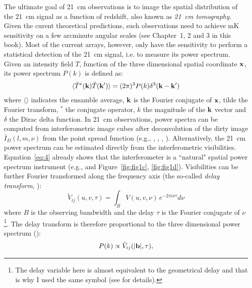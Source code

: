 The ultimate goal of 21~cm observations is to image the spatial distribution of the 21~cm signal as a function of redshift, also known as {\it 21~cm tomography}. Given the curent theoretical predictions, such observations need to achieve mK sensitivity on a few arcminute angular scales (see Chapter~1, 2 and 3 in this book). Most of the current arrays, however, only have the sensitivity to perform a statistical detection of the 21~cm signal, i.e. to measure its power spectrum. Given an intensity field $T$, function of the three dimensional spatial coordinate $\bf x$, its power spectrum $P(k)$ is defined as:
\begin{equation}
\langle {\tilde T}^* ({\bf k}) {\tilde T}({\bf k'}) \rangle = (2 \pi)^3 P(k) \delta^3({\bf k} - {\bf k}')
\label{sec_observables_eq1}
\end{equation}
where $\langle \rangle$ indicates the ensamble average, $\bf k$ is the Fourier conjugate of $\bf x$, tilde the Fourier transform, $^*$ the conjugate operator, $k$ the magnitude of the $\bf k$ vector and $\delta$ the Dirac delta function. In 21~cm observations, power spectra can be computed from interferometric image cubes after deconvolution of the dirty image ${\bar I}_D (l,m,\nu)$ from the point spread function (e.g., \cite{pen09}, \cite{harker10}, \cite{beardsley16}, \cite{patil17}). Alternatively, the 21~cm power spectrum can be estimated directly from the interferometric visibilities. Equation~\ref{eq:4} already shows that the interferometer is a ``natural" spatial power spectrum instrument (e.g., \cite{white99} and Figure~\ref{fig:fig1c}, \ref{fig:fig1d}). Visibilities can be further Fourier transformed along the frequency axis (the so-called {\it delay transform}, \cite{parsons12a}): 
\begin{equation}
{\tilde V}_{ij} (u,v, \tau) = \int_B V (u,v, \nu) \, e^{-2 \pi i \nu \tau} d \nu
\label{sec_observables_eq2}
\end{equation}
where $B$ is the observing bandwidth and the delay $\tau$ is the Fourier conjugate of $\nu$\footnote{The delay variable here is almost equivalent to the geometrical delay and that is why I used the same symbol (see \cite{parsons12a} for details).}. The delay transform is therefore proportional to the three dimensional power spectrum (\cite{parsons12b}):
\begin{equation}
P(k) \propto {\tilde V}_{ij} (|{\bf b}|, \tau),
\label{sec_observables_eq3}
\end{equation}
